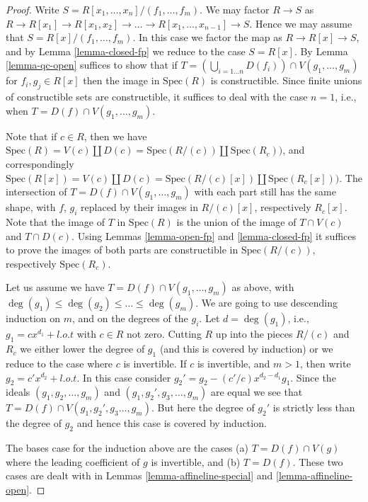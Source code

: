 \begin{proof}
Write $S = R[x_1, \ldots, x_n]/(f_1, \ldots, f_m)$.
We may factor $R \to S$ as $R \to R[x_1] \to R[x_1, x_2]
\to \ldots \to R[x_1, \ldots, x_{n-1}] \to S$. Hence
we may assume that $S = R[x]/(f_1, \ldots, f_m)$.
In this case we factor the map as $R \to R[x] \to S$,
and by Lemma \ref{lemma-closed-fp} we reduce to
the case $S = R[x]$. By Lemma \ref{lemma-qc-open} suffices
to show that if
$T = (\bigcup_{i = 1\ldots n} D(f_i)) \cap V(g_1, \ldots, g_m)$
for $f_i , g_j \in R[x]$ then the image in $\text{Spec}(R)$ is
constructible. Since finite unions of constructible sets
are constructible, it suffices to deal with the case $n = 1$,
i.e., when $T = D(f) \cap V(g_1, \ldots, g_m)$.

\medskip\noindent
Note that if $c \in R$, then we have $\text{Spec}(R) =
V(c) \coprod D(c) = \text{Spec}(R/(c)) \coprod
\text{Spec}(R_c))$, and correspondingly $\text{Spec}(R[x]) =
V(c) \coprod D(c) = \text{Spec}(R/(c)[x]) \coprod
\text{Spec}(R_c[x]))$. The intersection of $T = D(f) \cap V(g_1, \ldots, g_m)$
with each part still has the same shape, with $f$, $g_i$ replaced
by their images in $R/(c)[x]$, respectively $R_c[x]$.
Note that the image of $T$
in $\text{Spec}(R)$ is the union of the image of
$T \cap V(c)$ and $T \cap D(c)$. Using Lemmas \ref{lemma-open-fp}
and \ref{lemma-closed-fp} it suffices to prove the images of both
parts are constructible in $\text{Spec}(R/(c))$, respectively
$\text{Spec}(R_c)$.

\medskip\noindent
Let us assume we have $T = D(f) \cap V(g_1, \ldots, g_m)$
as above, with $\deg(g_1) \leq \deg(g_2) \leq \ldots \leq \deg(g_m)$.
We are going to use descending induction on $m$, and on the
degrees of the $g_i$. Let $d = \deg(g_1)$, i.e., $g_1 = c x^{d_1} + l.o.t$
with $c \in R$ not zero. Cutting $R$ up into the pieces
$R/(c)$ and $R_c$ we either lower the degree of $g_1$ (and this
is covered by induction)
or we reduce to the case where $c$ is invertible.
If $c$ is invertible, and $m > 1$, then write
$g_2 = c' x^{d_2} + l.o.t$. In this case consider
$g_2' = g_2 - (c'/c) x^{d_2 - d_1} g_1$. Since the ideals
$(g_1, g_2, \ldots, g_m)$ and $(g_1, g_2', g_3, \ldots, g_m)$
are equal we see that $T = D(f) \cap V(g_1, g_2', g_3\ldots, g_m)$.
But here the degree of $g_2'$ is strictly less than the degree
of $g_2$ and hence this case is covered by induction.

\medskip\noindent
The bases case for the induction above are the cases
(a) $T = D(f) \cap V(g)$ where the leading coefficient
of $g$ is invertible, and (b) $T = D(f)$. These two cases
are dealt with in Lemmas \ref{lemma-affineline-special}
and \ref{lemma-affineline-open}.
\end{proof}











